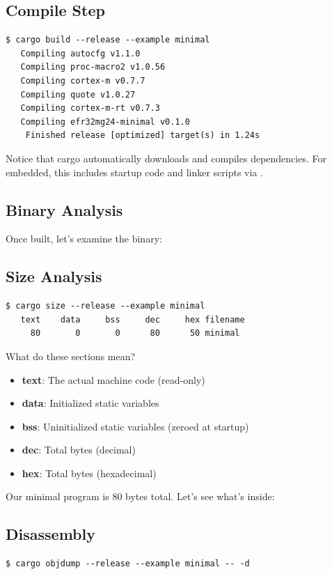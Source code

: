 \subsection{Compile Step}
\begin{verbatim}
$ cargo build --release --example minimal
   Compiling autocfg v1.1.0
   Compiling proc-macro2 v1.0.56
   Compiling cortex-m v0.7.7
   Compiling quote v1.0.27
   Compiling cortex-m-rt v0.7.3
   Compiling efr32mg24-minimal v0.1.0
    Finished release [optimized] target(s) in 1.24s
\end{verbatim}

Notice that cargo automatically downloads and compiles dependencies. For embedded,
this includes startup code and linker scripts via .

\subsection{Binary Analysis}
\label{sec:binary-analysis}

Once built, let's examine the binary:

\subsection{Size Analysis}
\begin{verbatim}
$ cargo size --release --example minimal
   text    data     bss     dec     hex filename
     80       0       0      80      50 minimal
\end{verbatim}

What do these sections mean?
\begin{itemize}
    \item \textbf{text}: The actual machine code (read-only)
    \item \textbf{data}: Initialized static variables
    \item \textbf{bss}: Uninitialized static variables (zeroed at startup)
    \item \textbf{dec}: Total bytes (decimal)
    \item \textbf{hex}: Total bytes (hexadecimal)
\end{itemize}

Our minimal program is 80 bytes total. Let's see what's inside:

\subsection{Disassembly}
\begin{verbatim}
$ cargo objdump --release --example minimal -- -d
\end{verbatim}

